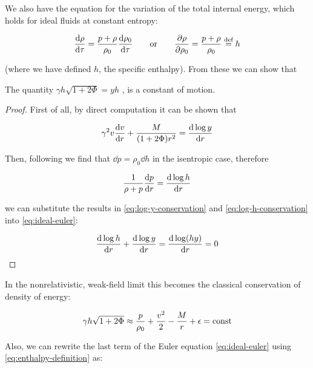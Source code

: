 \documentclass[main.tex]{subfiles}
\begin{document}
We also have the equation for the variation of the total internal energy, which holds for ideal fluids at constant entropy:

\begin{equation} \label{eq:enthalpy-definition}
    \dv{\rho}{\tau} = \frac{p+\rho}{\rho_0} \dv{\rho_0}{\tau}
    \qquad
    \text{or}
    \qquad
    \pdv{\rho}{\rho_0} = \frac{p + \rho}{\rho_0} \defeq h
\end{equation}

(where we have defined $h$, the specific enthalpy).
From these we can show that

\begin{claim}
The quantity $\gamma h \sqrt{1+2\Phi} = yh$ , is a constant of motion.
\end{claim}

\begin{proof}
First of all, by direct computation it can be shown that

\begin{equation} \label{eq:log-y-conservation}
  \gamma^2 v \dv{v}{r} + \frac{M}{(1+ 2 \Phi) r^2} = \dv{\log y }{r}
\end{equation}

Then, following \textcite[section 6.3]{Gourgoulhon:2006bn} we find that \(\dd{p} = \rho_0 \dd{h}\) in the isentropic case, therefore

\begin{equation} \label{eq:log-h-conservation}
  \frac{1}{\rho + p} \dv{p}{r}  =  \dv{\log h}{r}
\end{equation}

we can substitute the results in \eqref{eq:log-y-conservation} and \eqref{eq:log-h-conservation} into \eqref{eq:ideal-euler}:

\begin{equation}
  \dv{\log h}{r} + \dv{\log y }{r} = \dv{\log (hy) }{r} = 0
\end{equation}

\end{proof}

In the nonrelativistic, weak-field limit this  becomes the classical conservation of density of energy:

\begin{equation}
    \gamma h \sqrt{1+2\Phi} \approx \frac{p}{\rho_0} + \frac{v^2}{2} - \frac{M}{r} + \epsilon = \const
\end{equation}

Also, we can rewrite the last term of the Euler equation \eqref{eq:ideal-euler} using \eqref{eq:enthalpy-definition}  as:
\end{document}
